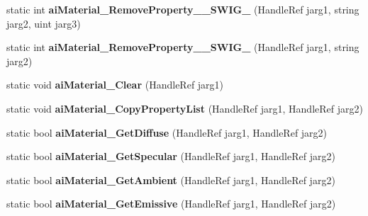 \begin{DoxyCompactItemize}
\item 
\hypertarget{class_assimp_p_i_n_v_o_k_e_ae2142b82a0220e624af6c6eae83a486c}{static int {\bfseries ai\+Material\+\_\+\+Remove\+Property\+\_\+\+\_\+\+S\+W\+I\+G\+\_} (Handle\+Ref jarg1, string jarg2, uint jarg3)}\label{class_assimp_p_i_n_v_o_k_e_ae2142b82a0220e624af6c6eae83a486c}

\item 
\hypertarget{class_assimp_p_i_n_v_o_k_e_ac5c6ef08ee79c13d211ac6c4e8be3a44}{static int {\bfseries ai\+Material\+\_\+\+Remove\+Property\+\_\+\+\_\+\+S\+W\+I\+G\+\_} (Handle\+Ref jarg1, string jarg2)}\label{class_assimp_p_i_n_v_o_k_e_ac5c6ef08ee79c13d211ac6c4e8be3a44}

\item 
\hypertarget{class_assimp_p_i_n_v_o_k_e_a43f6617a50bca444ba7a9c743bfc002a}{static void {\bfseries ai\+Material\+\_\+\+Clear} (Handle\+Ref jarg1)}\label{class_assimp_p_i_n_v_o_k_e_a43f6617a50bca444ba7a9c743bfc002a}

\item 
\hypertarget{class_assimp_p_i_n_v_o_k_e_a9786e5158394467f56c0b7a2266359fb}{static void {\bfseries ai\+Material\+\_\+\+Copy\+Property\+List} (Handle\+Ref jarg1, Handle\+Ref jarg2)}\label{class_assimp_p_i_n_v_o_k_e_a9786e5158394467f56c0b7a2266359fb}

\item 
\hypertarget{class_assimp_p_i_n_v_o_k_e_a455b5c66550f2577920fbd795dc8d11e}{static bool {\bfseries ai\+Material\+\_\+\+Get\+Diffuse} (Handle\+Ref jarg1, Handle\+Ref jarg2)}\label{class_assimp_p_i_n_v_o_k_e_a455b5c66550f2577920fbd795dc8d11e}

\item 
\hypertarget{class_assimp_p_i_n_v_o_k_e_a62bb5e167b2ea4b89ada81b150cef35b}{static bool {\bfseries ai\+Material\+\_\+\+Get\+Specular} (Handle\+Ref jarg1, Handle\+Ref jarg2)}\label{class_assimp_p_i_n_v_o_k_e_a62bb5e167b2ea4b89ada81b150cef35b}

\item 
\hypertarget{class_assimp_p_i_n_v_o_k_e_a5f575955f612f2cdf6d31ffdb08ffa7c}{static bool {\bfseries ai\+Material\+\_\+\+Get\+Ambient} (Handle\+Ref jarg1, Handle\+Ref jarg2)}\label{class_assimp_p_i_n_v_o_k_e_a5f575955f612f2cdf6d31ffdb08ffa7c}

\item 
\hypertarget{class_assimp_p_i_n_v_o_k_e_ab9b17f09a58cf2ace2e834e832d2c95e}{static bool {\bfseries ai\+Material\+\_\+\+Get\+Emissive} (Handle\+Ref jarg1, Handle\+Ref jarg2)}\label{class_assimp_p_i_n_v_o_k_e_ab9b17f09a58cf2ace2e834e832d2c95e}


\end{DoxyCompactItemize}
